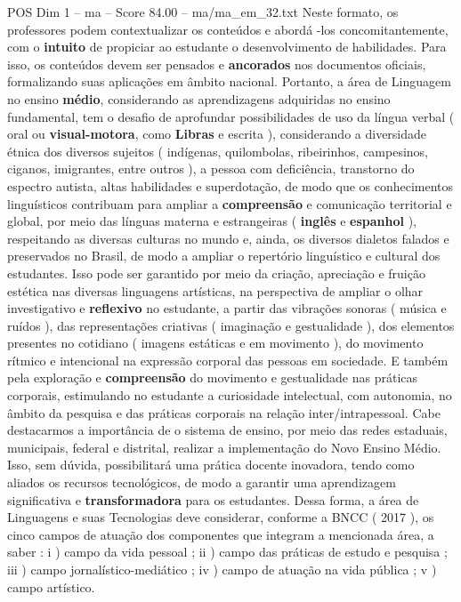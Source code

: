 \begin{textsample}{POS Dim 1 – ma – Score 84.00 – ma/ma\_em\_32.txt}
Neste formato, os professores podem contextualizar os conteúdos e abordá -los concomitantemente, com o \textbf{intuito} de propiciar ao estudante o desenvolvimento de habilidades.
Para isso, os conteúdos devem ser pensados e \textbf{ancorados} nos documentos oficiais, formalizando suas aplicações em âmbito nacional.
Portanto, a área de Linguagem no ensino \textbf{médio}, considerando as aprendizagens adquiridas no ensino fundamental, tem o desafio de aprofundar possibilidades de uso da língua verbal ( oral ou \textbf{visual-motora}, como \textbf{Libras} e escrita ), considerando a diversidade étnica dos diversos sujeitos ( indígenas, quilombolas, ribeirinhos, campesinos, ciganos, imigrantes, entre outros ), a pessoa com deficiência, transtorno do espectro autista, altas habilidades e superdotação, de modo que os conhecimentos linguísticos contribuam para ampliar a \textbf{compreensão} e comunicação territorial e global, por meio das línguas materna e estrangeiras ( \textbf{inglês} e \textbf{espanhol} ), respeitando as diversas culturas no mundo e, ainda, os diversos dialetos falados e preservados no Brasil, de modo a ampliar o repertório linguístico e cultural dos estudantes.
Isso pode ser garantido por meio da criação, apreciação e fruição estética nas diversas linguagens artísticas, na perspectiva de ampliar o olhar investigativo e \textbf{reflexivo} no estudante, a partir das vibrações sonoras ( música e ruídos ), das representações criativas ( imaginação e gestualidade ), dos elementos presentes no cotidiano ( imagens estáticas e em movimento ), do movimento rítmico e intencional na expressão corporal das pessoas em sociedade.
E também pela exploração e \textbf{compreensão} do movimento e gestualidade nas práticas corporais, estimulando no estudante a curiosidade intelectual, com autonomia, no âmbito da pesquisa e das práticas corporais na relação inter/intrapessoal.
Cabe destacarmos a importância de o sistema de ensino, por meio das redes estaduais, municipais, federal e distrital, realizar a implementação do Novo Ensino Médio.
Isso, sem dúvida, possibilitará uma prática docente inovadora, tendo como aliados os recursos tecnológicos, de modo a garantir uma aprendizagem significativa e \textbf{transformadora} para os estudantes.
Dessa forma, a área de Linguagens e suas Tecnologias deve considerar, conforme a BNCC ( 2017 ), os cinco campos de atuação dos componentes que integram a mencionada área, a saber : i ) campo da vida pessoal ; ii ) campo das práticas de estudo e pesquisa ; iii ) campo jornalístico-mediático ; iv ) campo de atuação na vida pública ; v ) campo artístico.

\end{textsample}
